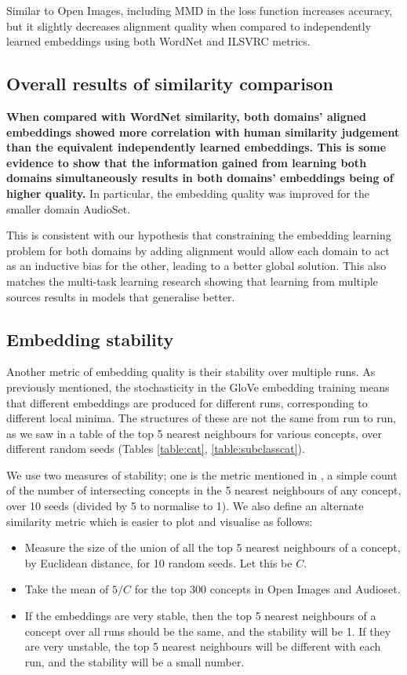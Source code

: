 Similar to Open Images, including MMD in the loss function increases accuracy, but it slightly decreases alignment quality when compared to independently learned embeddings using both WordNet and ILSVRC metrics.

\subsection{Overall results of similarity comparison}
\textbf{When compared with WordNet similarity, both domains' aligned embeddings showed more correlation with human similarity judgement than the equivalent independently learned embeddings. This is some evidence to show that the information gained from learning both domains simultaneously results in both domains' embeddings being of higher quality.} In particular, the embedding quality was improved for the smaller domain AudioSet. 
 
This is consistent with our hypothesis that constraining the embedding learning problem for both domains by adding alignment would allow each domain to act as an inductive bias for the other, leading to a better global solution. This also matches the multi-task learning research showing that learning from multiple sources results in models that generalise better.


\subsection{Embedding stability}
\label{section:stability}
Another metric of embedding quality is their stability over multiple runs. As previously mentioned, the stochasticity in the GloVe embedding training means that different embeddings are produced for different runs, corresponding to different local minima. The structures of these are not the same from run to run, as we saw in a table of the top 5 nearest neighbours for various concepts, over different random seeds (Tables \ref{table:cat}, \ref{table:subclasscat}). 

We use two measures of stability; one is the metric mentioned in \cite{WordEmbeddingStability}, a simple count of the number of intersecting concepts in the 5 nearest neighbours of any concept, over 10 seeds (divided by 5 to normalise to 1). We also define an alternate similarity metric which is easier to plot and visualise as follows:

\begin{itemize}
    \item Measure the size of the union of all the top 5 nearest neighbours of a concept, by Euclidean distance, for 10 random seeds. Let this be $C$. 
    \item Take the mean of $5/C$ for the top 300 concepts in Open Images and Audioset.
    \item If the embeddings are very stable, then the top 5 nearest neighbours of a concept over all runs should be the same, and the stability will be 1. If they are very unstable, the top 5 nearest neighbours will be different with each run, and the stability will be a small number. 
\end{itemize}

